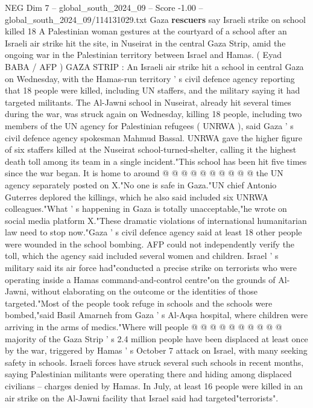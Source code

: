 \begin{textsample}{NEG Dim 7 – global\_south\_2024\_09 – Score -1.00 – global\_south\_2024\_09/114131029.txt}  \label{ex:f7_neg_224}
Gaza \textbf{rescuers} say Israeli strike on school killed 18 A Palestinian woman gestures at the courtyard of a school after an Israeli air strike hit the site, in Nuseirat in the central Gaza Strip, amid the ongoing war in the Palestinian territory between Israel and Hamas. ( Eyad BABA / AFP ) GAZA STRIP : An Israeli air strike hit a school in central Gaza on Wednesday, with the Hamas-run territory ' s civil defence agency reporting that 18 people were killed, including UN staffers, and the military saying it had targeted militants.
The Al-Jawni school in Nuseirat, already hit several times during the war, was struck again on Wednesday, killing 18 people, including two members of the UN agency for Palestinian refugees ( UNRWA ), said Gaza ' s civil defence agency spokesman Mahmud Bassal.
UNRWA gave the higher figure of six staffers killed at the Nuseirat school-turned-shelter, calling it the highest death toll among its team in a single incident."This school has been hit five times since the war began.
It is home to around @ @ @ @ @ @ @ @ @ @ the UN agency separately posted on X."No one is safe in Gaza."UN chief Antonio Guterres deplored the killings, which he also said included six UNRWA colleagues."What ' s happening in Gaza is totally unacceptable,"he wrote on social media platform X."These dramatic violations of international humanitarian law need to stop now."Gaza ' s civil defence agency said at least 18 other people were wounded in the school bombing.
AFP could not independently verify the toll, which the agency said included several women and children.
Israel ' s military said its air force had"conducted a precise strike on terrorists who were operating inside a Hamas command-and-control centre"on the grounds of Al-Jawni, without elaborating on the outcome or the identities of those targeted."Most of the people took refuge in schools and the schools were bombed,"said Basil Amarneh from Gaza ' s Al-Aqsa hospital, where children were arriving in the arms of medics."Where will people @ @ @ @ @ @ @ @ @ @ majority of the Gaza Strip ' s 2.4 million people have been displaced at least once by the war, triggered by Hamas ' s October 7 attack on Israel, with many seeking safety in schools.
Israeli forces have struck several such schools in recent months, saying Palestinian militants were operating there and hiding among displaced civilians -- charges denied by Hamas.
In July, at least 16 people were killed in an air strike on the Al-Jawni facility that Israel said had targeted"terrorists".

\end{textsample}
